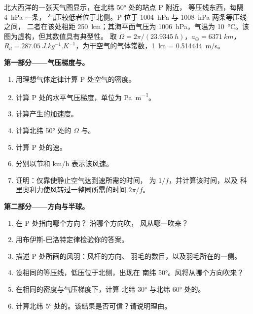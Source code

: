 \begin{problem}
\label{pb:b1:atmospheric-circulation:1}
北大西洋的一张天气图显示，在北纬 \ang{50} 处的站点 P 附近，
等压线东西，每隔 \qty{4}{hPa} 一条，
气压较低者位于北侧。P 位于 \qty{1004}{hPa} 与 \qty{1008}{hPa} 两条等压线之间，
二者在该处相距 \qty{250}{km}；其海平面气压为 \qty{1006}{hPa}，气温为
\qty{10}{\degreeCelsius}。该图为虚构，但其数值具有典型性。
取 $\Omega = 2\pi/(\qty{23.9345}{h})$，$a_\oplus = \qty{6371}{km}$，$R_d =
\qty{287.05}{J.kg^{-1}.K^{-1}}$，为干空气的气体常数，\qty{1}{kn} = \qty{0.514444}{m/s}。

\medskip
\noindent\textbf{第一部分——气压梯度与。}
\begin{enumerate}
  \item 用理想气体定律计算 P 处空气的密度。
  \item 计算 P 处的水平气压梯度，单位为 \unit{Pa.m^{-1}}。
  \item 计算产生的加速度。
  \item 计算北纬 \ang{50} 处的 $\Omega$ 与。
  \item 计算 P 处的速。
  \item 分别以节和 \unit{km/h} 表示该风速。
  \item 证明：仅靠使静止空气达到速所需的时间，
        为 $1/f$，并计算该时间，以及
        科里奥利力使风转过一整圈所需的时间 $2\pi/f$。
\end{enumerate}

\medskip
\noindent\textbf{第二部分——方向与半球。}
\begin{enumerate}[resume]
  \item {}在 P 处指向哪个方向？
        沿哪个方向吹，
        风从哪一吹来？
  \item 用布伊斯-巴洛特定律检验你的答案。
  \item 描述 P 处所画的风羽：风杆的方向、
        羽毛的数目，以及羽毛所在的一侧。
  \item 设相同的等压线，低压位于北侧，出现在
        南纬 \ang{50}。风将从哪个方向吹来？
  \item 在相同的密度与气压梯度下，计算
        北纬 \ang{30} 与北纬 \ang{60} 处的。
  \item 计算北纬 \ang{5} 处的。该结果是否可信？请说明理由。
\end{enumerate}


\end{problem}
